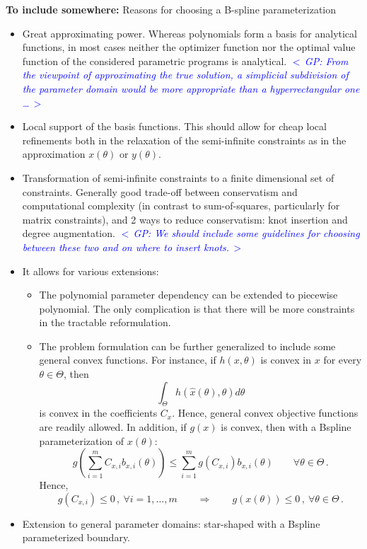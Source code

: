 \documentclass{article}
\newcommand{\ppar}{\theta}                  %
\newcommand{\Ppar}{\Theta}                  %
\newcommand{\commentGP}[1]{\noindent \textcolor{blue}{\emph{$<\,$GP: #1$\,>$}}}%
\begin{document}
\vspace*{12pt}
\noindent\textbf{To include somewhere:} Reasons for choosing a B-spline parameterization
\begin{itemize}
\item Great approximating power. Whereas polynomials form a basis for analytical functions, in most cases neither the optimizer function nor the optimal value function of the considered parametric programs is analytical. \commentGP{From the viewpoint of approximating the true solution, a simplicial subdivision of the parameter domain would be more appropriate than a hyperrectangular one \ldots}
\item Local support of the basis functions. This should allow for cheap local refinements both in the relaxation of the semi-infinite constraints as in the approximation $x(\ppar)$ or $y(\ppar)$.
\item Transformation of semi-infinite constraints to a finite dimensional set of constraints. Generally good trade-off between conservatism and computational complexity (in contrast to sum-of-squares, particularly for matrix constraints), and 2 ways to reduce conservatism: knot insertion and degree augmentation. \commentGP{We should include some guidelines for choosing between these two and on where to insert knots.}
\item It allows for various extensions:
    \begin{itemize}
    \item The polynomial parameter dependency can be extended to piecewise polynomial. The only complication is that there will be more constraints in the tractable reformulation.
    \item The problem formulation can be further generalized to include some general convex functions. For instance, if $h(x,\ppar)$ is convex in $x$ for every $\ppar\in\Ppar$, then
        \[ \int_{\Ppar} h(\hat{x}(\ppar), \ppar) d\ppar
        \]
        is convex in the coefficients $C_x$. Hence, general convex objective functions are readily allowed. In addition, if $g(x)$ is convex, then with a Bspline parameterization of $x(\ppar)$:
        \[ g\left(\sum_{i=1}^m C_{x,i} b_{x,i}(\ppar)\right) \leq \sum_{i=1}^m g(C_{x,i}) b_{x,i}(\ppar) \qquad \forall \ppar\in\Ppar\,. %
        \]
        Hence,
        \[ g(C_{x,i})\leq 0\,,~\forall i=1,\ldots,m \qquad \Rightarrow \qquad g(x(\ppar))\leq0\,,~\forall \ppar\in\Ppar\,.%
        \]
        \end{itemize}
    \item Extension to general parameter domains: star-shaped with a Bspline parameterized boundary.
\end{itemize}
\end{document}
